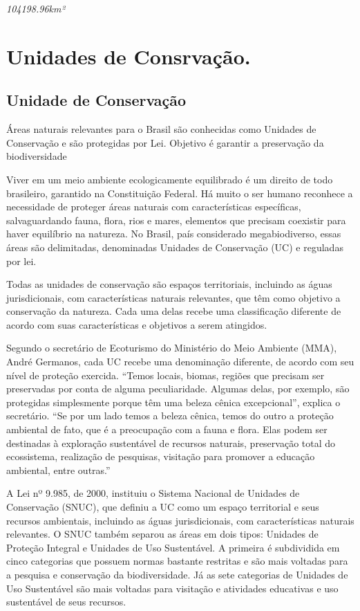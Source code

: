 \documentclass[
  letterpaper,
]{report}
\begin{document}
\emph{104198.96km²}


\hypertarget{unidades-de-consrvauxe7uxe3o.}{%
\chapter{Unidades de Consrvação.}\label{unidades-de-consrvauxe7uxe3o.}}

\hypertarget{unidade-de-conservauxe7uxe3o}{%
\section{Unidade de Conservação}\label{unidade-de-conservauxe7uxe3o}}

Áreas naturais relevantes para o Brasil são conhecidas como Unidades de
Conservação e são protegidas por Lei. Objetivo é garantir a preservação
da biodiversidade

Viver em um meio ambiente ecologicamente equilibrado é um direito de
todo brasileiro, garantido na Constituição Federal. Há muito o ser
humano reconhece a necessidade de proteger áreas naturais com
características específicas, salvaguardando fauna, flora, rios e mares,
elementos que precisam coexistir para haver equilíbrio na natureza. No
Brasil, país considerado megabiodiverso, essas áreas são delimitadas,
denominadas Unidades de Conservação (UC) e reguladas por lei.

Todas as unidades de conservação são espaços territoriais, incluindo as
águas jurisdicionais, com características naturais relevantes, que têm
como objetivo a conservação da natureza. Cada uma delas recebe uma
classificação diferente de acordo com suas características e objetivos a
serem atingidos.

Segundo o secretário de Ecoturismo do Ministério do Meio Ambiente (MMA),
André Germanos, cada UC recebe uma denominação diferente, de acordo com
seu nível de proteção exercida. ``Temos locais, biomas, regiões que
precisam ser preservadas por conta de alguma peculiaridade. Algumas
delas, por exemplo, são protegidas simplesmente porque têm uma beleza
cênica excepcional'', explica o secretário. ``Se por um lado temos a
beleza cênica, temos do outro a proteção ambiental de fato, que é a
preocupação com a fauna e flora. Elas podem ser destinadas à exploração
sustentável de recursos naturais, preservação total do ecossistema,
realização de pesquisas, visitação para promover a educação ambiental,
entre outras.''

A Lei nº 9.985, de 2000, instituiu o Sistema Nacional de Unidades de
Conservação (SNUC), que definiu a UC como um espaço territorial e seus
recursos ambientais, incluindo as águas jurisdicionais, com
características naturais relevantes. O SNUC também separou as áreas em
dois tipos: Unidades de Proteção Integral e Unidades de Uso Sustentável.
A primeira é subdividida em cinco categorias que possuem normas bastante
restritas e são mais voltadas para a pesquisa e conservação da
biodiversidade. Já as sete categorias de Unidades de Uso Sustentável são
mais voltadas para visitação e atividades educativas e uso sustentável
de seus recursos.
\end{document}
